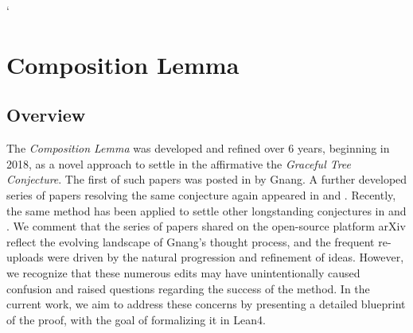`%
%

\chapter{\texorpdfstring{Composition Lemma}{Composition Lemma}}

\section{Overview}
The \textit{Composition Lemma} was developed and refined over 6 years, beginning in 2018, as a novel approach to settle in the affirmative the \textit{Graceful Tree Conjecture}. The first of such papers was posted in \cite{gnang2020gracefullabelingstrees} by Gnang. A further developed series of papers resolving the same conjecture again appeared in \cite{gnang2022compositionlemma} and \cite{gnang2023proofkotzigringelrosaconjecture}. Recently, the same method has been applied to settle other longstanding conjectures in \cite{chalise2024treenedgesdecomposes} and \cite{chalise2024prooftreepackingconjecture}. We comment that the series of papers shared on the open-source platform arXiv reflect the evolving landscape of Gnang's thought process, and the frequent re-uploads were driven by the natural progression and refinement of ideas. However, we recognize that these numerous edits may have unintentionally caused confusion and raised questions regarding the success of the method. In the current work, we aim to address these concerns by presenting a detailed blueprint of the proof, with the goal of formalizing it in Lean4.

